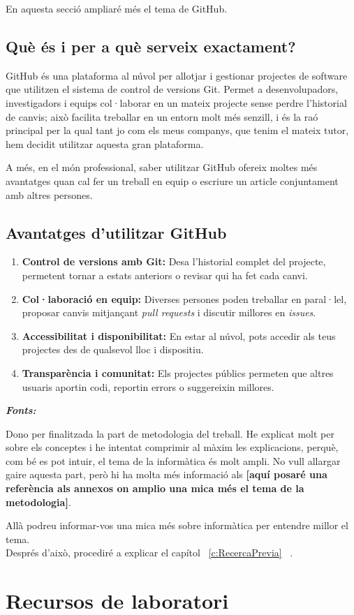 En aquesta secció ampliaré més el tema de GitHub.

\subsection{Què és i per a què serveix exactament?}
GitHub és una plataforma al núvol per allotjar i gestionar projectes de software que utilitzen el sistema de control de versions Git. Permet a desenvolupadors, investigadors i equips col·laborar en un mateix projecte sense perdre l’historial de canvis; això facilita treballar en un entorn molt més senzill, i és la raó principal per la qual tant jo com els meus companys, que tenim el mateix tutor, hem decidit utilitzar aquesta gran plataforma.

A més, en el món professional, saber utilitzar GitHub ofereix moltes més avantatges quan cal fer un treball en equip o escriure un article conjuntament amb altres persones.

\subsection{Avantatges d’utilitzar GitHub}
\begin{enumerate}
 \item \textbf{Control de versions amb Git:} Desa l’historial complet del projecte, permetent tornar a estats anteriors o revisar qui ha fet cada canvi.
 \item \textbf{Col·laboració en equip:} Diverses persones poden treballar en paral·lel, proposar canvis mitjançant \textit{pull requests} i discutir millores en \textit{issues}.
 \item \textbf{Accessibilitat i disponibilitat:} En estar al núvol, pots accedir als teus projectes des de qualsevol lloc i dispositiu.
 \item \textbf{Transparència i comunitat:} Els projectes públics permeten que altres usuaris aportin codi, reportin errors o suggereixin millores.
\end{enumerate}

\textit{\textbf{Fonts:}} \cite{GH}

Dono per finalitzada la part de metodologia del treball. He explicat molt per sobre els conceptes i he intentat comprimir al màxim les explicacions, perquè, com bé es pot intuir, el tema de la informàtica és molt ampli. No vull allargar gaire aquesta part, però hi ha molta més informació als \textbf{[aquí posaré una referència als annexos on amplio una mica més el tema de la metodologia]}.

Allà podreu informar-vos una mica més sobre informàtica per entendre millor el tema.\\

Després d’això, procediré a explicar el capítol ~\ref{c:RecercaPrevia} ~.

\section{Recursos de laboratori}

